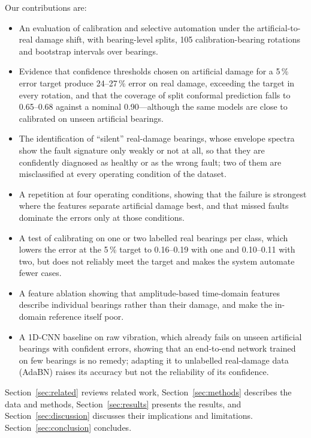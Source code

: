 Our contributions are:
\begin{itemize}[nosep]
  \item An evaluation of calibration and selective automation under the artificial-to-real damage shift, with
        bearing-level splits, 105 calibration-bearing rotations and bootstrap intervals over bearings.
  \item Evidence that confidence thresholds chosen on artificial damage for a 5\,\% error target produce 24--27\,\%
        error on real damage, exceeding the target in every rotation, and that the coverage of split conformal
        prediction falls to 0.65--0.68 against a nominal 0.90---although the same models are close to calibrated on unseen artificial
        bearings.
  \item The identification of ``silent'' real-damage bearings, whose envelope spectra show the fault signature only
        weakly or not at all, so that they are confidently diagnosed as healthy or as the wrong fault; two of them
        are misclassified at every operating condition of the dataset.
  \item A repetition at four operating conditions, showing that the failure is strongest where the features
        separate artificial damage best, and that missed faults dominate the errors only at those conditions.
  \item A test of calibrating on one or two labelled real bearings per class, which lowers the error at the 5\,\%
        target to 0.16--0.19 with one and 0.10--0.11 with two, but does not reliably meet the target and makes the
        system automate fewer cases.
  \item A feature ablation showing that amplitude-based time-domain features describe individual bearings rather
        than their damage, and make the in-domain reference itself poor.
  \item A 1D-CNN baseline on raw vibration, which already fails on unseen artificial bearings with confident errors,
        showing that an end-to-end network trained on few bearings is no remedy; adapting it to unlabelled
        real-damage data (AdaBN) raises its accuracy but not the reliability of its confidence.
\end{itemize}

Section~\ref{sec:related} reviews related work, Section~\ref{sec:methods} describes the data and methods,
Section~\ref{sec:results} presents the results, and Section~\ref{sec:discussion} discusses their implications and
limitations. Section~\ref{sec:conclusion} concludes.
